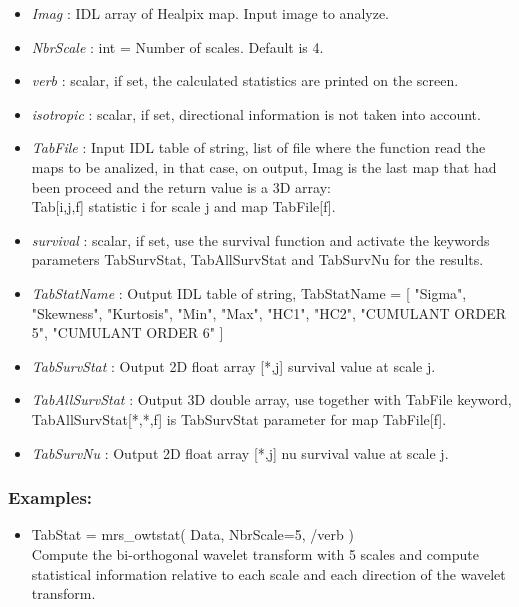 \begin{itemize}
\item {\em Imag} : IDL array of Healpix map. Input image to analyze. 
\item {\em NbrScale} : int = Number of scales. Default is 4.  
\item {\em verb} : scalar, if set, the calculated statistics are printed on the screen.
\item {\em isotropic} : scalar, if set, directional information is not taken into account.
\item {\em TabFile} : Input IDL table of string, list of file where the function read the maps to be analized, in that case, on output, 
Imag is the last map that had been proceed and the return value is a 3D array:\\
Tab[i,j,f] \qquad statistic i for scale j and map TabFile[f].
\item {\em survival} : scalar, if set, use the survival function and activate the keywords parameters 
TabSurvStat, TabAllSurvStat and TabSurvNu for the results.
\item {\em TabStatName} : Output IDL table of string, TabStatName = [ "Sigma", "Skewness", "Kurtosis", "Min", "Max", "HC1", "HC2", "CUMULANT ORDER 5", "CUMULANT ORDER 6" ]
\item {\em TabSurvStat} : Output 2D float array [*,j] survival value at scale j.
\item {\em TabAllSurvStat} : Output 3D double array, use together with TabFile keyword, TabAllSurvStat[*,*,f] is TabSurvStat parameter for map TabFile[f].
\item {\em TabSurvNu} : Output 2D float array [*,j] nu survival value at scale j.
\end{itemize}

\subsubsection*{Examples:} 
\begin{itemize}
\item TabStat = mrs\_owtstat( Data, NbrScale=5, /verb )  \\
Compute the bi-orthogonal wavelet transform with 5 scales and compute statistical information 
relative to each scale and each direction of the wavelet transform.
\end{itemize}



